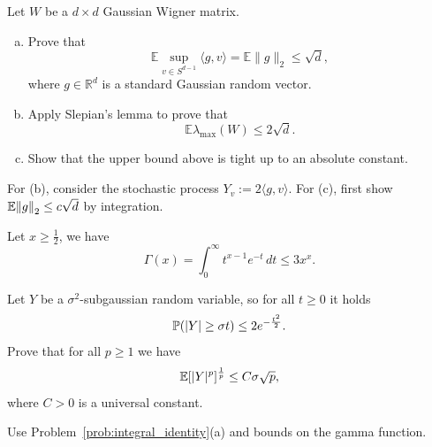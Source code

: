 \begin{myexercise}
    \label{prob:slepian_lemma}
    Let $W$ be a $d \times d$ Gaussian Wigner matrix.
    \begin{enumerate}[(a)]
        \item Prove that
        \begin{equation*}
            \mathbb{E}\sup_{v\in S^{d-1}}\langle g,v\rangle = \mathbb{E}\|g\|_2 \le \sqrt{d},
        \end{equation*}
        where $g \in \mathbb{R}^d$ is a standard Gaussian random vector.
        
        \item Apply Slepian's lemma to prove that
        \begin{equation*}
            \mathbb{E}\lambda_{\max}(W) \le 2\sqrt{d}.
        \end{equation*}
        
        \item Show that the upper bound above is tight up to an absolute constant.
    \end{enumerate}
\end{myexercise}
\begin{hint}
   For (b), consider the stochastic process $Y_{v}:=2\langle g,v\rangle$. For (c), first show $\mathbb{E}{\left\lVert{g}\right\rVert}_2 \leq c\sqrt{d}$ by integration.
\end{hint}


\begin{lemma}
    Let $x \geq \frac12$, we have 
    $$ \Gamma(x) = \int_0^\infty t^{x-1}e^{-t} \, dt \leq 3x^x.$$
\end{lemma}

\begin{myexercise}
    \label{prob:subgaussian_moments}
    Let $Y$ be a $\sigma^2$-subgaussian random variable, so for all $t \geq 0$ it holds
    $$ {\mathbb{P}}(|Y| \geq \sigma t) \leq 2e^{-\frac{t^2}{2}}.$$
    Prove that for all $p\geq 1$ we have
    $$ \mathbb{E}[|Y|^p]^{\frac1p} \leq C\sigma\sqrt{p},$$
    where $C>0$ is a universal constant.
    \begin{hint}
        Use Problem~\ref{prob:integral_identity}(a) and bounds on the gamma function.
    \end{hint}
\end{myexercise}









